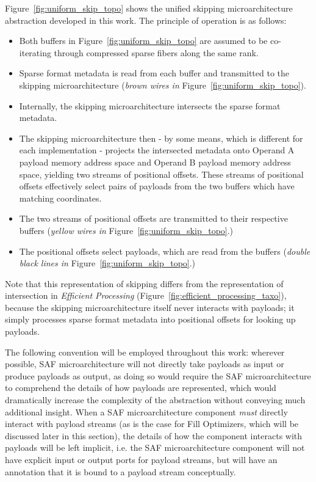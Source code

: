Figure~\ref{fig:uniform_skip_topo} shows the unified skipping microarchitecture abstraction developed in this work. The principle of operation is as follows:

\begin{itemize}
    \item Both buffers in Figure~\ref{fig:uniform_skip_topo} are assumed to be co-iterating through compressed sparse fibers along the same rank.
    \item Sparse format metadata is read from each buffer and transmitted to the skipping microarchitecture (\textit{brown wires in} Figure~\ref{fig:uniform_skip_topo}).
    \item Internally, the skipping microarchitecture intersects the sparse format metadata. 
    \item The skipping microarchitecture then - by some means, which is different for each implementation - projects the intersected metadata onto Operand A payload memory address space and Operand B payload memory address space, yielding two streams of positional offsets. These streams of positional offsets effectively select pairs of payloads from the two buffers which have matching coordinates.
    \item The two streams of positional offsets are transmitted to their respective buffers (\textit{yellow wires in} Figure~\ref{fig:uniform_skip_topo}.)
    \item The positional offsets select payloads, which are read from the buffers (\textit{double black lines in} Figure~\ref{fig:uniform_skip_topo}.)
\end{itemize}

Note that this representation of skipping differs from the representation of intersection in \textit{Efficient Processing} (Figure~\ref{fig:efficient_processing_taxo}), because the skipping microarchitecture itself never interacts with payloads; it simply processes sparse format metadata into positional offsets for looking up payloads. 

The following convention will be employed throughout this work: wherever possible, SAF microarchitecture will not directly take payloads as input or produce payloads as output, as doing so would require the SAF microarchitecture to comprehend the details of how payloads are represented, which would dramatically increase the complexity of the abstraction without conveying much additional insight. When a SAF microarchitecture component \textit{must} directly interact with payload streams (as is the case for Fill Optimizers, which will be discussed later in this section), the details of how the component interacts with payloads will be left implicit, i.e. the SAF microarchitecture component will not have explicit input or output ports for payload streams, but will have an annotation that it is bound to a payload stream conceptually.

